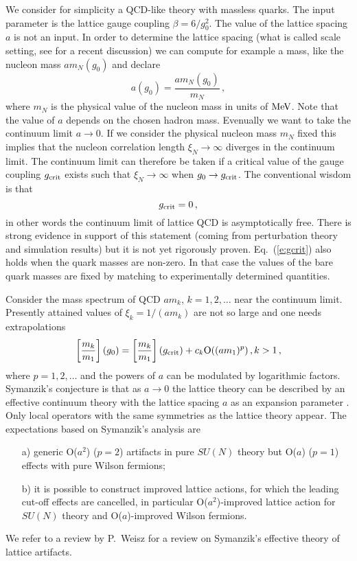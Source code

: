 \documentclass{PoS}
\newcommand{\Eq}[1]{Eq.~(\ref{#1})}
\newcommand{\SU}[1]{SU(#1)}
\begin{document}
We consider for simplicity a QCD-like theory with massless quarks.
The input parameter is the lattice gauge coupling $\beta=6/g_0^2$.
The value of the lattice spacing $a$ is not an input. In order to
determine the lattice spacing (what is called scale setting, see
\cite{Sommer:2014mea} for a recent discussion) we 
can compute for example a mass, like the nucleon mass $am_N(g_0)$
and declare
\begin{equation}  
a(g_0) = \frac{am_N(g_0)}{m_N} \,,
\end{equation}
where $m_N$ is the physical value of the nucleon mass in units of $\rm{MeV}$.
Note that the value of $a$ depends on the chosen hadron mass.
Evenually we want to take the continuum limit $a\to0$. If we
consider the physical nucleon mass $m_N$ fixed this implies that 
the nucleon correlation length $\xi_N\to\infty$ diverges in the
continuum limit. The continuum limit can therefore be taken if
a critical value of the gauge coupling $g_{\rm crit}$ exists such that
$\xi_N\to\infty$ when $g_0\to g_{\rm crit}$.
The conventional wisdom is that
\begin{equation}\label{e:gcrit}
g_{\rm crit}=0 \,,
\end{equation}
in other words the continuum limit of lattice QCD is asymptotically free.
There is strong evidence in support of this statement (coming from
perturbation theory and simulation results) but it is not yet rigorously proven.
\Eq{e:gcrit} also holds when the quark masses are non-zero. In that case
the values of the bare quark masses are fixed by matching to experimentally
determined quantities.

Consider the mass spectrum of QCD $am_k$, $k=1,2,\ldots$ near the 
continuum limit.
Presently attained values of $\xi_k=1/(am_k)$ are not so large and one
needs extrapolations
\begin{equation}
\left[\frac{m_k}{m_1}\right](g_0) =
\left[\frac{m_k}{m_1}\right](g_{\rm crit}) + c_k {\rm O}((am_1)^p)\,, k>1 \,,
\end{equation}
where $p=1,2,\ldots$ and the powers of $a$ can be modulated by logarithmic
factors.
Symanzik's conjecture is that as $a\to0$ the lattice theory
can be described by an effective continuum theory with the lattice spacing $a$
as an expansion parameter \cite{Symanzik:1979ph}. Only local 
operators with the same symmetries as the 
lattice theory appear.
The expectations based on Symanzik's analysis are
\begin{itemize}
\item[a)] generic O($a^2$) ($p=2$) artifacts in pure $\SU{N}$ theory but
O($a$) ($p=1$) effects with pure Wilson fermions;
\item[b)] it is possible to construct improved lattice actions, for which
the leading cut-off effects are cancelled, in particular
O($a^2$)-improved lattice action for $\SU{N}$ theory and 
O($a$)-improved Wilson fermions.
\end{itemize}
We refer to a review by P.~Weisz \cite{Weisz:2010nr} for a review on 
Symanzik's effective theory of lattice artifacts.
\end{document}
